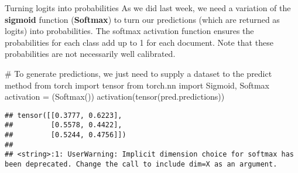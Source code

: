 \documentclass[
  10pt,
  ignorenonframetext,
  aspectratio=169]{beamer}
\newenvironment{Shaded}{\begin{snugshade}}{\end{snugshade}}
\newcommand{\CommentTok}[1]{\textcolor[rgb]{0.50,0.62,0.50}{#1}}
\newcommand{\ImportTok}[1]{\textcolor[rgb]{0.80,0.80,0.80}{#1}}
\newcommand{\NormalTok}[1]{\textcolor[rgb]{0.80,0.80,0.80}{#1}}
\newcommand{\OperatorTok}[1]{\textcolor[rgb]{0.94,0.94,0.82}{#1}}
\begin{document}
\begin{frame}[fragile]{Turning logits into probabilities}
\protect\hypertarget{turning-logits-into-probabilities}{}
As we did last week, we need a variation of the \textbf{sigmoid}
function (\textbf{Softmax}) to turn our predictions (which are returned
as logits) into probabilities. The softmax activation function ensures
the probabilities for each class add up to 1 for each document. Note
that these probabilities are not necessarily well calibrated.

\medskip
\scriptsize

\begin{Shaded}
\begin{Highlighting}[]
\CommentTok{\# To generate predictions, we just need to supply a dataset to the predict method}
\ImportTok{from}\NormalTok{ torch }\ImportTok{import}\NormalTok{ tensor}
\ImportTok{from}\NormalTok{ torch.nn }\ImportTok{import}\NormalTok{ Sigmoid, Softmax}
\NormalTok{activation }\OperatorTok{=}\NormalTok{ (Softmax())}
\NormalTok{activation(tensor(pred.predictions))}
\end{Highlighting}
\end{Shaded}

\begin{verbatim}
## tensor([[0.3777, 0.6223],
##         [0.5578, 0.4422],
##         [0.5244, 0.4756]])
## 
## <string>:1: UserWarning: Implicit dimension choice for softmax has been deprecated. Change the call to include dim=X as an argument.
\end{verbatim}
\end{frame}
\end{document}
